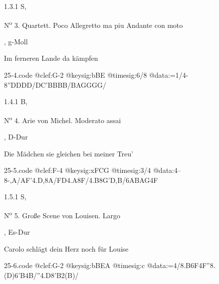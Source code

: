 \documentclass[a4paper, twocolumn, 11pt]{book}
\begin{document}
\newline %
\par 1.3.1  S, \begin{itshape}N\textsuperscript{o} 3. Quartett. Poco Allegretto ma piu Andante con moto\end{itshape}, g-Moll\newline \begin{footnotesize} Im ferneren Lande da kämpfen \end{footnotesize}  
\begin{filecontents*}{25-4.code}
@clef:G-2
@keysig:bBE
@timesig:6/8
@data:=1/4-8''DDDD/DC'BBBB/BAGGGG/
\end{filecontents*}

\newline %
\par 1.4.1  B, \begin{itshape}N\textsuperscript{o} 4. Arie von Michel. Moderato assai\end{itshape}, D-Dur\newline \begin{footnotesize} Die Mädchen sie gleichen bei meiner Treu' \end{footnotesize}  
\begin{filecontents*}{25-5.code}
@clef:F-4
@keysig:xFCG
@timesig:3/4
@data:4--8-,A/{AF}'4.D,8A/{FD}4.A8F/4.B8G'{D,B}/{6ABAG}4F
\end{filecontents*}

\newline %
\par 1.5.1  S, \begin{itshape}N\textsuperscript{o} 5. Große Scene von Louisen. Largo\end{itshape}, Es-Dur\newline \begin{footnotesize} Carolo schlägt dein Herz noch für Louise \end{footnotesize}  
\begin{filecontents*}{25-6.code}
@clef:G-2
@keysig:bBEA
@timesig:c
@data:=4/{8.B6F}4F''{8.(D)6'B}4B/''4.D8'B2(B)/
\end{filecontents*}
\end{document}
